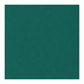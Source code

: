 \begin{figure}

    \begin{subfigure}[t]{.24\textwidth}
        \centering
        \includegraphics[width=\linewidth]{figures/color-vgg-tv-rel-noise-patch-single.png}
        

\end{subfigure}
\end{figure}

